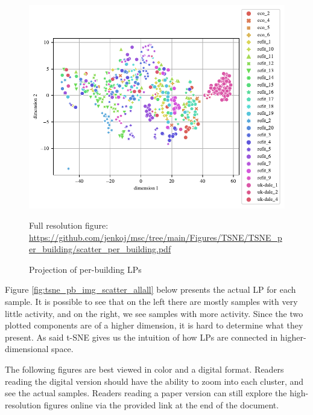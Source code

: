 \begin{figure}[H]
	\centering
	\caption{Projection of per-building LPs}
	\includegraphics[]{Figures/TSNE/TSNE_per_building/scatter_per_building.pdf}
	\label{fig:tsne_scatter_non_norm_all}
	\par
	\par\footnotesize{Full resolution figure: \url{https://github.com/jenkoj/msc/tree/main/Figures/TSNE/TSNE_per_building/scatter_per_building.pdf}}
\end{figure}

Figure \ref{fig:tsne_pb_img_scatter_allall} below presents the actual LP for each sample. 
It is possible to see that on the left there are mostly samples with very little activity,
and on the right, we see samples with more activity.
Since the two plotted components are of a higher dimension, it is hard to determine what they present.
As said t-SNE gives us the intuition of how LPs are connected in higher-dimensional space.

The following figures are best viewed in color and a digital format. 
Readers reading the digital version should have the ability to zoom into each cluster, and see the actual samples. 
Readers reading a paper version can still explore the high-resolution figures online via the provided link at the end of the document.

